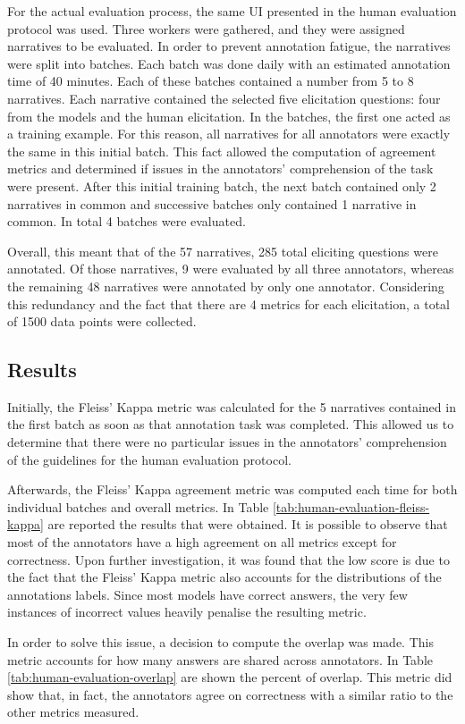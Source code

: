 For the actual evaluation process, the same UI presented in the human evaluation protocol was used. %
Three workers were gathered, and they were assigned narratives to be evaluated.  
In order to prevent annotation fatigue, the narratives were split into batches. Each batch was done daily with an estimated annotation time of 40 minutes. Each of these batches contained a number from 5 to 8 narratives. Each narrative contained the selected five elicitation questions: four from the models and the human elicitation. In the batches, the first one acted as a training example. For this reason, all narratives for all annotators were exactly the same in this initial batch. This fact allowed the computation of agreement metrics and determined if issues in the annotators' comprehension of the task were present. After this initial training batch, the next batch contained only 2 narratives in common and successive batches only contained 1 narrative in common. In total 4 batches were evaluated.

Overall, this meant that of the 57 narratives, 285 total eliciting questions were annotated. Of those narratives, 9 were evaluated by all three annotators, whereas the remaining 48 narratives were annotated by only one annotator. Considering this redundancy and the fact that there are 4 metrics for each elicitation, a total of 1500 data points were collected.


\subsection{Results}
Initially, the Fleiss' Kappa \cite{fleiss} metric was calculated for the 5 narratives contained in the first batch as soon as that annotation task was completed. This allowed us to determine that there were no particular issues in the annotators' comprehension of the guidelines for the human evaluation protocol.


Afterwards, the Fleiss' Kappa agreement metric was computed each time for both individual batches and overall metrics. In Table \ref{tab:human-evaluation-fleiss-kappa} are reported the results that were obtained. It is possible to observe that most of the annotators have a high agreement on all metrics except for correctness. Upon further investigation, it was found that the low score is due to the fact that the Fleiss' Kappa metric also accounts for the distributions of the annotations labels. Since most models have correct answers, the very few instances of incorrect values heavily penalise the resulting metric.

In order to solve this issue, a decision to compute the overlap was made. This metric accounts for how many answers are shared across annotators. In Table \ref{tab:human-evaluation-overlap} are shown the percent of overlap. This metric did show that, in fact, the annotators agree on correctness with a similar ratio to the other metrics measured. 



